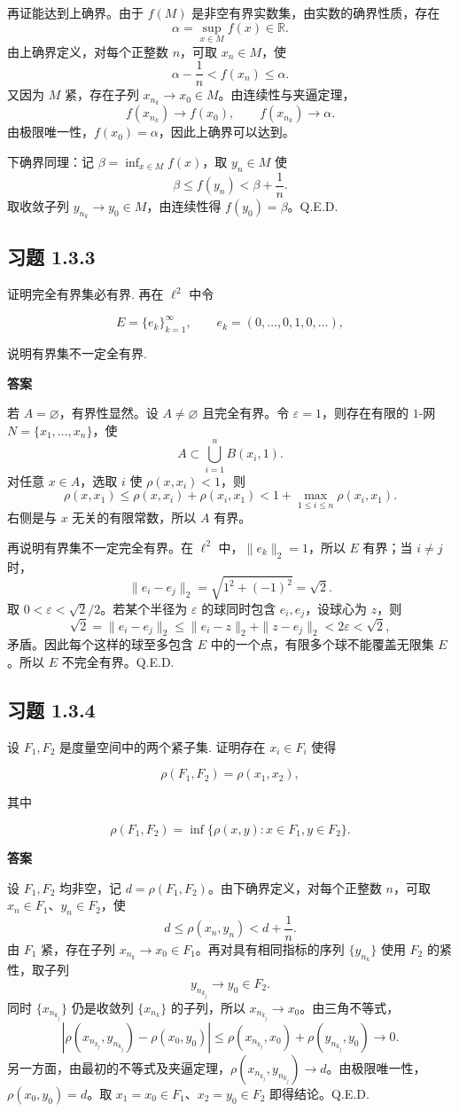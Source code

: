 \documentclass[UTF8,a4paper,11pt,fontset=fandol]{ctexart}
\newcommand{\exercise}[1]{\par\ifdim\dimexpr\pagegoal-\pagetotal\relax<7\baselineskip\newpage\fi\subsection*{习题 #1}}
\newcommand{\answer}{\par\smallskip\noindent\textbf{答案}\quad}
\newcommand{\qedherecustom}{\unskip\hfill\mbox{\normalfont Q.E.D.}\par}
\begin{document}
再证能达到上确界。由于 $f(M)$ 是非空有界实数集，由实数的确界性质，存在
\[
\alpha=\sup_{x\in M}f(x)\in\mathbb R.
\]
由上确界定义，对每个正整数 $n$，可取 $x_n\in M$，使
\[
\alpha-\frac1n<f(x_n)\leq\alpha.
\]
又因为 $M$ 紧，存在子列 $x_{n_k}\to x_0\in M$。由连续性与夹逼定理，
\[
f(x_{n_k})\longrightarrow f(x_0),\qquad
f(x_{n_k})\longrightarrow\alpha.
\]
由极限唯一性，$f(x_0)=\alpha$，因此上确界可以达到。

下确界同理：记 $\beta=\inf_{x\in M}f(x)$，取 $y_n\in M$ 使
\[
\beta\leq f(y_n)<\beta+\frac1n.
\]
取收敛子列 $y_{n_k}\to y_0\in M$，由连续性得 $f(y_0)=\beta$。\qedherecustom

\exercise{1.3.3}

证明完全有界集必有界. 再在 $\ell^2$ 中令

\[
E=\{e_k\}_{k=1}^{\infty},\qquad e_k=(0,\ldots,0,1,0,\ldots),
\]

说明有界集不一定全有界.

\answer

若 $A=\varnothing$，有界性显然。设 $A\ne\varnothing$ 且完全有界。令 $\varepsilon=1$，则存在有限的 $1$-网 $N=\{x_1,\ldots,x_n\}$，使
\[
A\subset\bigcup_{i=1}^nB(x_i,1).
\]
对任意 $x\in A$，选取 $i$ 使 $\rho(x,x_i)<1$，则
\[
\rho(x,x_1)\leq\rho(x,x_i)+\rho(x_i,x_1)
<1+\max_{1\leq i\leq n}\rho(x_i,x_1).
\]
右侧是与 $x$ 无关的有限常数，所以 $A$ 有界。

再说明有界集不一定完全有界。在 $\ell^2$ 中，$\|e_k\|_2=1$，所以 $E$ 有界；当 $i\ne j$ 时，
\[
\|e_i-e_j\|_2=\sqrt{1^2+(-1)^2}=\sqrt2.
\]
取 $0<\varepsilon<\sqrt2/2$。若某个半径为 $\varepsilon$ 的球同时包含 $e_i,e_j$，设球心为 $z$，则
\[
\sqrt2=\|e_i-e_j\|_2
\leq\|e_i-z\|_2+\|z-e_j\|_2<2\varepsilon<\sqrt2,
\]
矛盾。因此每个这样的球至多包含 $E$ 中的一个点，有限多个球不能覆盖无限集 $E$。所以 $E$ 不完全有界。\qedherecustom

\exercise{1.3.4}

设 $F_1,F_2$ 是度量空间中的两个紧子集. 证明存在 $x_i\in F_i$ 使得

\[
\rho(F_1,F_2)=\rho(x_1,x_2),
\]

其中

\[
\rho(F_1,F_2)=\inf\{\rho(x,y):x\in F_1,y\in F_2\}.
\]

\answer

设 $F_1,F_2$ 均非空，记 $d=\rho(F_1,F_2)$。由下确界定义，对每个正整数 $n$，可取 $x_n\in F_1$、$y_n\in F_2$，使
\[
d\leq\rho(x_n,y_n)<d+\frac1n.
\]
由 $F_1$ 紧，存在子列 $x_{n_k}\to x_0\in F_1$。再对具有相同指标的序列 $\{y_{n_k}\}$ 使用 $F_2$ 的紧性，取子列
\[
y_{n_{k_j}}\longrightarrow y_0\in F_2.
\]
同时 $\{x_{n_{k_j}}\}$ 仍是收敛列 $\{x_{n_k}\}$ 的子列，所以 $x_{n_{k_j}}\to x_0$。由三角不等式，
\[
\left|\rho(x_{n_{k_j}},y_{n_{k_j}})-\rho(x_0,y_0)\right|
\leq\rho(x_{n_{k_j}},x_0)+\rho(y_{n_{k_j}},y_0)
\longrightarrow0.
\]
另一方面，由最初的不等式及夹逼定理，$\rho(x_{n_{k_j}},y_{n_{k_j}})\to d$。由极限唯一性，$\rho(x_0,y_0)=d$。取 $x_1=x_0\in F_1$、$x_2=y_0\in F_2$ 即得结论。\qedherecustom
\end{document}
